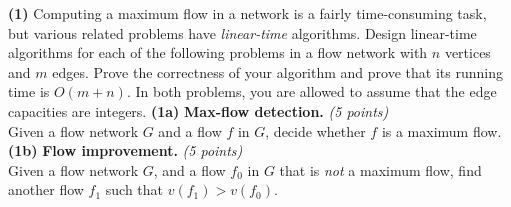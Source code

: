 \documentclass[11pt]{article}
\def\gap{0.1in}
\def\bigap{0.25in}
\begin{document}
\setlength{\parindent}{0in}
\addtolength{\parskip}{0.1cm}
\setlength{\fboxrule}{.5mm}\setlength{\fboxsep}{1.2mm}
\newlength{\boxlength}\setlength{\boxlength}{\textwidth}
\addtolength{\boxlength}{-4mm}
\begin{center}
\end{center}
\vspace{5mm}

{ \bf (1)}
Computing a maximum flow in a network is a fairly time-consuming
task, but various related problems have \emph{linear-time} algorithms.
Design linear-time 
algorithms for each of the following
problems in a flow network with $n$ vertices and $m$ edges.  Prove
the correctness of your algorithm and prove that its running time 
is $O(m+n)$.  In both problems, you are allowed to assume that
the edge capacities are integers.
\vskip \gap
{\bf (1a)} {\bf Max-flow detection.} {\em (5 points)}\\
  Given a flow network $G$ and a flow $f$ in $G$,
decide whether $f$ is a maximum flow.
\vskip \gap
{\bf (1b)} {\bf Flow improvement.} {\em (5 points)}\\
  Given a flow network $G$, and a flow $f_0$ in $G$
that is \emph{not} a maximum flow, find another flow $f_1$ such that 
$v(f_1) > v(f_0)$.

\vskip \bigap

\end{document}
